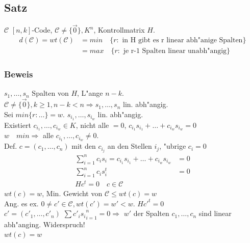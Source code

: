 %
%
\subsection{Satz}
$\mathcal{C}$ $[n,k]$-Code, $\mathcal{C} \neq \lbrace \vec{0} \rbrace, K^n$, Kontrollmatrix $H$.\\
\begin{align*}
d(\mathcal{C})=wt(\mathcal{C}) &= min \quad 	\lbrace r : \text{ in H gibt es r linear abh"anige Spalten}  \rbrace \\
&= max  \quad \lbrace r : \text{ je r-1 Spalten linear unabh"angig} \rbrace
\end{align*}

\subsubsection{Beweis}
$s_1,\ldots,s_n$ Spalten von $H$, L"ange $n-k$. \\
$\mathcal{C} \neq \lbrace \vec{0} \rbrace, k \geq	 1, n-k<n \Rightarrow s_1,\ldots,s_n$ lin. abh"angig.\\
Sei $min \lbrace r: \ldots \rbrace = w$. $s_{i_1},\ldots, s_{i_w}$ lin. abh"angig. \\
Existiert $c_{i_1},\ldots,c_{i_w} \in K$, nicht alle $=0$, $c_{i_1} s_{i_1}+\ldots+ c_{i_w} s_{i_w}=0$ \\
$w \quad min \Rightarrow$ alle $c_{i_1},\ldots, c_{i_w} \neq 0$. \\
Def. $c=(c_1, \ldots,  c_n)$ mit den $c_{i_j}$ an den Stellen $i_j$, "ubrige $c_i=0$
\begin{align*}
	\sum^n_{i=1}{c_i s_i} = c_{i_1} s_{i_1} + \ldots + c_{i_w} s_{i_w} &=0\\
	\sum^n_{i=1}{c_i s_i^t}&=0 \\
	Hc^t=0 \quad c \in \mathcal{C}
\end{align*}
$wt(c)=w$, Min. Gewicht von $\mathcal{C} \leq wt(c)=w$ \\
Ang. es ex. $0 \neq c' \in \mathcal{C}, wt(c')=w' < w$. $Hc'^t=0$\\
$c'=(c'_1, \ldots,  c'_n)$ \quad $\sum{c'_i s_i}^n_{i=1}=0 \Rightarrow$ $w'$ der Spalten $c_1,\ldots,c_n$ sind linear abh"anging. Widerspruch! \\
$wt(c)=w$

%
%

